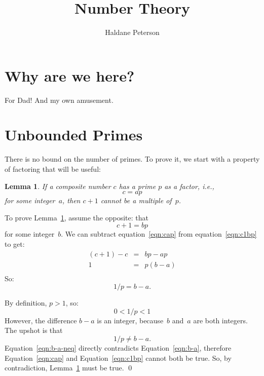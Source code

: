 \documentclass[twocolumn]{article}
\title{Number Theory}
\author{Haldane Peterson}
\newtheorem{lemma}{Lemma}
\begin{document}
\maketitle

\section{Why are we here?}

For Dad!
And my own amusement.

\section{Unbounded Primes}

There is no bound on the number of primes.
To prove it, we start with a property of factoring that will be
useful:

\begin{lemma}
\label{lemma:next-composite}
If a composite number $c$ has a prime $p$ as a factor, i.e.,
\begin{equation}
c = a p
\label{eqn:cap}
\end{equation}
for some integer~$a$, then $c+1$ \emph{cannot} be a multiple of~$p$.
\end{lemma}

To prove Lemma~\ref{lemma:next-composite}, assume the opposite:  that
\begin{equation}
c + 1 = b p
\label{eqn:c1bp}
\end{equation}
for some integer~$b$.
We can subtract equation~\ref{eqn:cap} from
equation~\ref{eqn:c1bp} to get:
\begin{eqnarray*}
(c + 1) - c & = & b p - a p \\
1 & = & p (b - a) \\
\end{eqnarray*}
So:
\begin{equation}
\label{eqn:b-a}
1 / p = b - a.
\end{equation}

By definition, $p > 1$, so:
\begin{equation*}
0 < 1 / p < 1
\end{equation*}
However, the difference $b-a$ is an integer, because~$b$ and~$a$ are
both integers.
The upshot is that
\begin{equation}
\label{eqn:b-a-neq}
1 / p \neq b - a.
\end{equation}
Equation~\ref{eqn:b-a-neq} directly contradicts
Equation~\ref{eqn:b-a},
therefore Equation~\ref{eqn:cap} and Equation~\ref{eqn:c1bp} cannot
both be true.
So, by contradiction, Lemma~\ref{lemma:next-composite} must be true.
\qed
\end{document}
